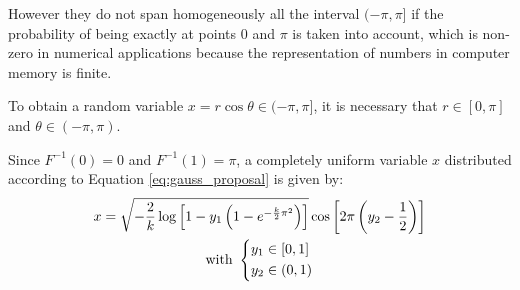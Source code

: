 However they do not span homogeneously all the interval $(-\pi,\pi]$ if the probability of being exactly at points $0$ and $\pi$ is taken into account,
which is non-zero in numerical applications because the representation of numbers in computer memory is finite.

To obtain a random variable $x = r\cos \theta \in (-\pi,\pi]$,
it is necessary that $r \in [0,\pi]$ and $\theta \in (-\pi,\pi)$.

Since $F^{-1}(0)=0$ and $F^{-1}(1)=\pi$,
a completely uniform variable $x$ distributed according to Equation \eqref{eq:gauss_proposal} is given by:
\begin{equation}\label{eq:gauss_angle}\begin{gathered}
    x = \sqrt{-\frac{2}{k}\log\left[1-y_1\left(1-e^{-\frac{k}{2}\pi^2}\right)\right]}\cos\left[2\pi\left(y_2-\frac{1}{2}\right)\right] \\
    \mathrm{with}\ \begin{dcases}
                         y_1 \in [0,1] \\
                         y_2 \in (0,1)
                   \end{dcases}
\end{gathered}\end{equation}

